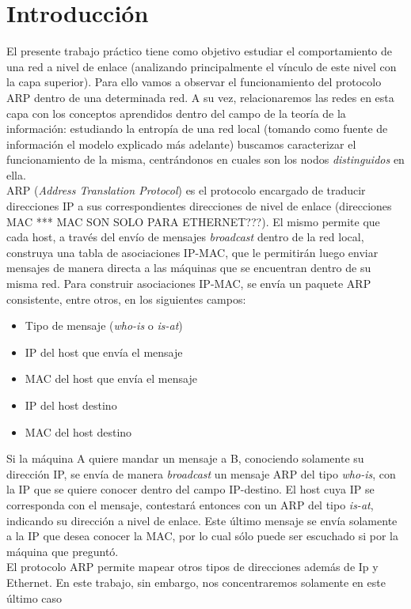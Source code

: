 \section{Introducci\'on}


El presente trabajo pr\'actico tiene como objetivo estudiar el comportamiento de una red a nivel de enlace (analizando principalmente el v\'inculo de este nivel con la capa superior). Para ello vamos a observar el funcionamiento del protocolo ARP dentro de una determinada red. A su vez, relacionaremos las redes en esta capa con los conceptos aprendidos dentro del campo de la teor\'ia de la informaci\'on: estudiando la entrop\'ia de una red local (tomando como fuente de informaci\'on el modelo explicado m\'as adelante) buscamos caracterizar el funcionamiento de la misma, centr\'andonos en cuales son los nodos \emph{distinguidos} en ella.\\

ARP (\emph{Address Translation Protocol}) es el protocolo encargado de traducir direcciones IP a sus correspondientes direcciones de nivel de enlace (direcciones MAC *** MAC SON SOLO PARA ETHERNET???). El mismo permite que cada host, a trav\'es del env\'io de mensajes \emph{broadcast} dentro de la red local, construya una tabla de asociaciones IP-MAC, que le permitir\'an luego enviar mensajes de manera directa a las m\'aquinas que se encuentran dentro de su misma red. Para construir asociaciones IP-MAC, se env\'ia un paquete ARP consistente, entre otros, en los siguientes campos:

\begin{itemize}
 \item Tipo de mensaje (\emph{who-is} o \emph{is-at})
 \item IP del host que env\'ia el mensaje
 \item MAC del host que env\'ia el mensaje
 \item IP del host destino
 \item MAC del host destino
\end{itemize}

Si la m\'aquina A quiere mandar un mensaje a B, conociendo solamente su direcci\'on IP, se env\'ia de manera \emph{broadcast} un mensaje ARP del tipo \emph{who-is}, con la IP que se quiere conocer dentro del campo IP-destino. El host cuya IP se corresponda con el mensaje, contestar\'a entonces con un ARP del tipo \emph{is-at}, indicando su direcci\'on a nivel de enlace. Este \'ultimo mensaje se env\'ia solamente a la IP que desea conocer la MAC, por lo cual s\'olo puede ser escuchado si por la m\'aquina que pregunt\'o.\\

El protocolo ARP permite mapear otros tipos de direcciones adem\'as de Ip y Ethernet. En este trabajo, sin embargo, nos concentraremos solamente en este \'ultimo caso
